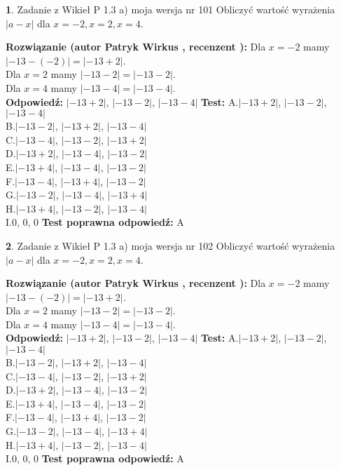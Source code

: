 \documentclass[12pt, a4paper]{article}
\theoremstyle{definition} %
\newtheorem{zad}{}
\newcommand{\zadStart}[1]{\begin{zad}#1\newline}
\newcommand{\zadStop}{\end{zad}}
\newcommand{\rozwStart}[2]{\noindent \textbf{Rozwiązanie (autor #1 , recenzent #2): }\newline}
\newcommand{\rozwStop}{\newline}
\newcommand{\odpStart}{\noindent \textbf{Odpowiedź:}\newline}
\newcommand{\odpStop}{\newline}
\newcommand{\testStart}{\noindent \textbf{Test:}\newline}
\newcommand{\testStop}{\newline}
\newcommand{\kluczStart}{\noindent \textbf{Test poprawna odpowiedź:}\newline}
\newcommand{\kluczStop}{\newline}
\begin{document}
\zadStart{Zadanie z Wikieł P 1.3 a) moja wersja nr 101}
Obliczyć wartość wyrażenia $|a - x|$ dla $x=-2,x=2,x=4$.
\zadStop
\rozwStart{Patryk Wirkus}{}
Dla $x = -2$ mamy $|-13 - (-2)| = |-13 + 2|$.\\
Dla $x = 2$ mamy $|-13 - 2| = |-13 - 2|$.\\
Dla $x = 4$ mamy $|-13 - 4| = |-13 - 4|$.\\
\rozwStop
\odpStart
$|-13 + 2|$, $|-13 - 2|$, $|-13 - 4|$
\odpStop
\testStart
A.$|-13 + 2|$, $|-13 - 2|$, $|-13 - 4|$\\
B.$|-13 - 2|$, $|-13 + 2|$, $|-13 - 4|$\\
C.$|-13 - 4|$, $|-13 - 2|$, $|-13 + 2|$\\
D.$|-13 + 2|$, $|-13 - 4|$, $|-13 - 2|$\\
E.$|-13 + 4|$, $|-13 - 4|$, $|-13 - 2|$\\
F.$|-13 - 4|$, $|-13 + 4|$, $|-13 - 2|$\\
G.$|-13 - 2|$, $|-13 - 4|$, $|-13 + 4|$\\
H.$|-13 + 4|$, $|-13 - 2|$, $|-13 - 4|$\\
I.$0$, $0$, $0$
\testStop
\kluczStart
A
\kluczStop



\zadStart{Zadanie z Wikieł P 1.3 a) moja wersja nr 102}
Obliczyć wartość wyrażenia $|a - x|$ dla $x=-2,x=2,x=4$.
\zadStop
\rozwStart{Patryk Wirkus}{}
Dla $x = -2$ mamy $|-13 - (-2)| = |-13 + 2|$.\\
Dla $x = 2$ mamy $|-13 - 2| = |-13 - 2|$.\\
Dla $x = 4$ mamy $|-13 - 4| = |-13 - 4|$.\\
\rozwStop
\odpStart
$|-13 + 2|$, $|-13 - 2|$, $|-13 - 4|$
\odpStop
\testStart
A.$|-13 + 2|$, $|-13 - 2|$, $|-13 - 4|$\\
B.$|-13 - 2|$, $|-13 + 2|$, $|-13 - 4|$\\
C.$|-13 - 4|$, $|-13 - 2|$, $|-13 + 2|$\\
D.$|-13 + 2|$, $|-13 - 4|$, $|-13 - 2|$\\
E.$|-13 + 4|$, $|-13 - 4|$, $|-13 - 2|$\\
F.$|-13 - 4|$, $|-13 + 4|$, $|-13 - 2|$\\
G.$|-13 - 2|$, $|-13 - 4|$, $|-13 + 4|$\\
H.$|-13 + 4|$, $|-13 - 2|$, $|-13 - 4|$\\
I.$0$, $0$, $0$
\testStop
\kluczStart
A
\kluczStop
\end{document}

